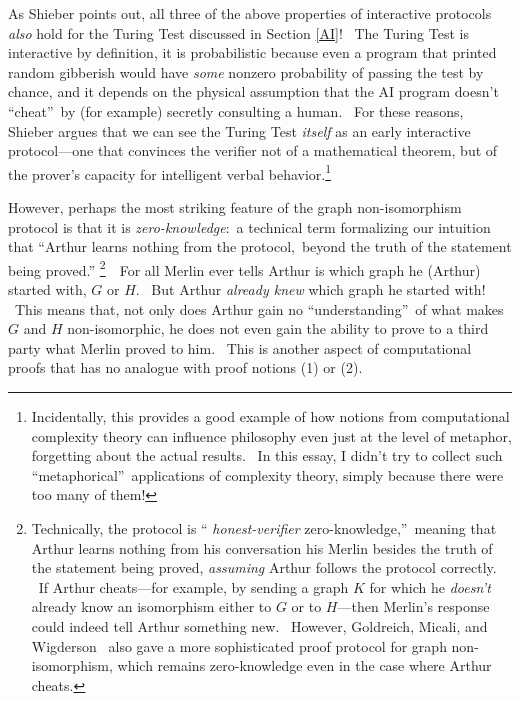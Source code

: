 \documentclass[11pt,onecolumn]{article}%
\begin{document}
As Shieber \cite{shieber} points out, all three of the above properties of
interactive protocols \textit{also} hold for the Turing Test discussed in
Section \ref{AI}! \ The Turing Test is interactive by definition, it is
probabilistic because even a program that printed random gibberish would have
\textit{some} nonzero probability of passing the test by chance, and it
depends on the physical assumption that the AI program doesn't
\textquotedblleft cheat\textquotedblright\ by (for example) secretly
consulting a human. \ For these reasons, Shieber argues that we can see the
Turing Test \textit{itself} as an early interactive protocol---one that
convinces the verifier not of a mathematical theorem, but of the prover's
capacity for intelligent verbal behavior.\footnote{Incidentally, this provides
a good example of how notions from computational complexity theory can
influence philosophy even just at the level of metaphor, forgetting about the
actual results. \ In this essay, I didn't try to collect such
\textquotedblleft metaphorical\textquotedblright\ applications of complexity
theory, simply because there were too many of them!}

However, perhaps the most striking feature of the graph non-isomorphism
protocol is that it is \textit{zero-knowledge}:\ a technical term formalizing
our intuition that \textquotedblleft Arthur learns nothing from the
protocol,\ beyond the truth of the statement being proved.\textquotedblright%
\footnote{Technically, the protocol is \textquotedblleft%
\textit{honest-verifier} zero-knowledge,\textquotedblright\ meaning that
Arthur learns nothing from his conversation his Merlin besides the truth of
the statement being proved, \textit{assuming} Arthur follows the protocol
correctly. \ If Arthur cheats---for example, by sending a graph $K$ for which
he \textit{doesn't} already know an isomorphism either to $G$ or to $H$---then
Merlin's response could indeed tell Arthur something new. \ However,
Goldreich, Micali, and Wigderson \cite{gmw}\ also gave a more sophisticated
proof protocol for graph non-isomorphism, which remains zero-knowledge even in
the case where Arthur cheats.}\ \ For all Merlin ever tells Arthur is which
graph he (Arthur) started with, $G$ or $H$. \ But Arthur \textit{already knew}
which graph he started with! \ This means that, not only does Arthur gain no
\textquotedblleft understanding\textquotedblright\ of what makes $G$ and $H$
non-isomorphic, he does not even gain the ability to prove to a third party
what Merlin proved to him. \ This is another aspect of computational proofs
that has no analogue with proof notions (1) or (2).
\end{document}
